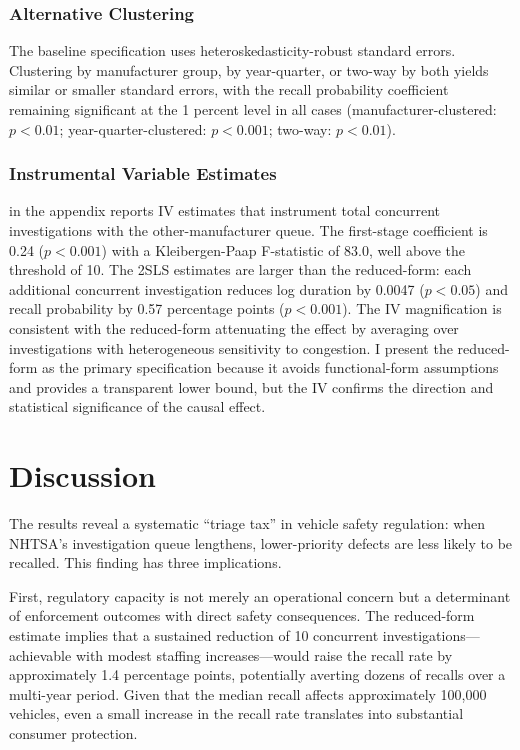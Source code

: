 \documentclass[12pt]{article}
\begin{document}


\subsubsection*{Alternative Clustering} The baseline specification uses heteroskedasticity-robust standard errors. Clustering by manufacturer group, by year-quarter, or two-way by both yields similar or smaller standard errors, with the recall probability coefficient remaining significant at the 1 percent level in all cases (manufacturer-clustered: $p < 0.01$; year-quarter-clustered: $p < 0.001$; two-way: $p < 0.01$).

\subsubsection*{Instrumental Variable Estimates}  in the appendix reports IV estimates that instrument total concurrent investigations with the other-manufacturer queue. The first-stage coefficient is 0.24 ($p < 0.001$) with a Kleibergen-Paap F-statistic of 83.0, well above the \citet{stock2002testing} threshold of 10. The 2SLS estimates are larger than the reduced-form: each additional concurrent investigation reduces log duration by 0.0047 ($p < 0.05$) and recall probability by 0.57 percentage points ($p < 0.001$). The IV magnification is consistent with the reduced-form attenuating the effect by averaging over investigations with heterogeneous sensitivity to congestion. I present the reduced-form as the primary specification because it avoids functional-form assumptions and provides a transparent lower bound, but the IV confirms the direction and statistical significance of the causal effect.

\section{Discussion}

The results reveal a systematic ``triage tax'' in vehicle safety regulation: when NHTSA's investigation queue lengthens, lower-priority defects are less likely to be recalled. This finding has three implications.

First, regulatory capacity is not merely an operational concern but a determinant of enforcement outcomes with direct safety consequences. The reduced-form estimate implies that a sustained reduction of 10 concurrent investigations---achievable with modest staffing increases---would raise the recall rate by approximately 1.4 percentage points, potentially averting dozens of recalls over a multi-year period. Given that the median recall affects approximately 100,000 vehicles, even a small increase in the recall rate translates into substantial consumer protection.
\end{document}
